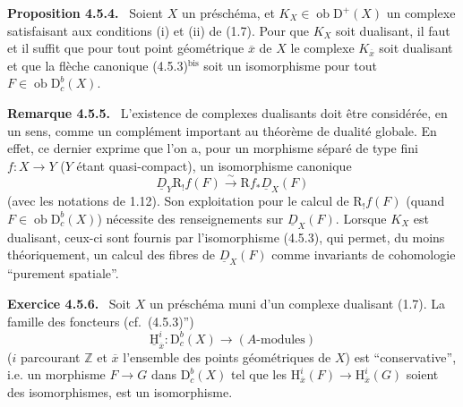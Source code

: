 \documentclass[11pt]{article}
\newenvironment{statement}[1]{\par\medskip\noindent\textbf{#1.}\ }{\par\medskip}
\renewcommand{\H}{\mathrm{H}}
\newcommand{\R}{\mathrm{R}}\newcommand{\RHomCore}{\mathrm{RHom}}
\newcommand{\D}{\mathrm{D}}
\newcommand{\Z}{\mathbb{Z}}
\newcommand{\ob}{\operatorname{ob}}
\newcommand{\ol}[1]{\overline{#1}}
\providecommand{\ob}{\operatorname{ob}}
\providecommand{\R}{\mathrm R}
\providecommand{\Z}{\mathbb Z}
\begin{document}
\begin{statement}{Proposition 4.5.4}
Soient $X$ un préschéma, et $K_X\in\ob\D^+(X)$ un complexe satisfaisant aux conditions (i) et (ii) de (1.7). Pour que $K_X$ soit dualisant, il faut et il suffit que pour tout point géométrique $\ol{x}$ de $X$ le complexe $K_{\ol{x}}$ soit dualisant et que la flèche canonique (4.5.3)$^{\mathrm{bis}}$ soit un isomorphisme pour tout $F\in\ob\D_c^b(X)$.
\end{statement}

\begin{statement}{Remarque 4.5.5}
L'existence de complexes dualisants doit être considérée, en un sens, comme un complément important au théorème de dualité globale. En effet, ce dernier exprime que l'on a, pour un morphisme séparé de type fini $f:X\to Y$ ($Y$ étant quasi-compact), un isomorphisme canonique
\[
\underline{D}_Y\R_!f(F)\xrightarrow{\sim}\R f_*\underline{D}_X(F)
\]
(avec les notations de 1.12). Son exploitation pour le calcul de $\R_!f(F)$ (quand $F\in\ob\D_c^b(X)$) nécessite des renseignements sur $\underline{D}_X(F)$. Lorsque $K_X$ est dualisant, ceux-ci sont fournis par l'isomorphisme (4.5.3), qui permet, du moins théoriquement, un calcul des fibres de $\underline{D}_X(F)$ comme invariants de cohomologie ``purement spatiale''.
\end{statement}

\begin{statement}{Exercice 4.5.6}
Soit $X$ un préschéma muni d'un complexe dualisant (1.7). La famille des foncteurs (cf.~(4.5.3)'')
\[
\underline{\H}_{\ol{x}}^i:\D_c^b(X)\longrightarrow (A\text{-modules})
\]
($i$ parcourant $\Z$ et $\ol{x}$ l'ensemble des points géométriques de $X$) est ``conservative'', i.e. un morphisme $F\to G$ dans $\D_c^b(X)$ tel que les $\H_{\ol{x}}^i(F)\to\H_{\ol{x}}^i(G)$ soient des isomorphismes, est un isomorphisme.
\end{statement}
\end{document}
